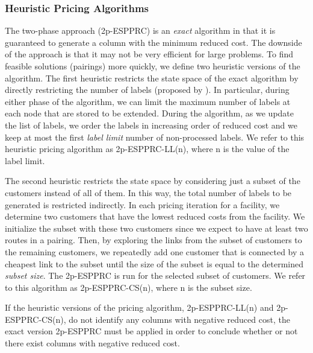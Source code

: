 \documentclass[11pt]{article}
\begin{document}
\subsubsection{Heuristic Pricing Algorithms}
The two-phase approach (2p-ESPPRC) is an {\em exact} algorithm in that it is guaranteed to generate a column
with the minimum reduced cost.  The downside of the approach is that it may not be
very efficient for large problems.  To find feasible solutions (pairings) more quickly, we define 
two heuristic versions of the algorithm.  The first heuristic restricts the state space 
of the exact algorithm by directly restricting the number of labels (proposed
by \citet{Dumitrescu}). In particular, during 
either phase of the algorithm, we can limit the maximum number of 
labels at each node that are stored to be extended.  During the algorithm,
as we update the list of labels, we order the labels in increasing order of reduced cost 
and we keep at most the first {\em label limit} number of non-processed  labels.  
We refer to this heuristic pricing algorithm as 2p-ESPPRC-LL(n), where n is the value
of the label limit.

The second heuristic restricts the state space by considering just a subset of the 
customers instead of all of them. In this way, the total number of labels to be 
generated is restricted indirectly. In each pricing iteration for a facility,   
we determine two customers that have the lowest reduced costs from the facility.  
We initialize the subset with these two
customers since we expect to have at least two routes in a pairing.  Then, by 
exploring the links from the subset of customers to the remaining customers, we repeatedly add one customer 
that is connected by a cheapest link to the subset until 
the size of the subset is equal to the determined {\em subset size}.
The 2p-ESPPRC is run for the selected subset of customers. 
We refer to this algorithm as 2p-ESPPRC-CS(n), where n is the subset size.

If the heuristic versions of the pricing algorithm,  2p-ESPPRC-LL(n) and 2p-ESPPRC-CS(n),
do not identify any columns with negative reduced cost, the exact version  2p-ESPPRC 
must be applied in order to conclude whether or not there exist columns with negative reduced cost.  
\end{document}
